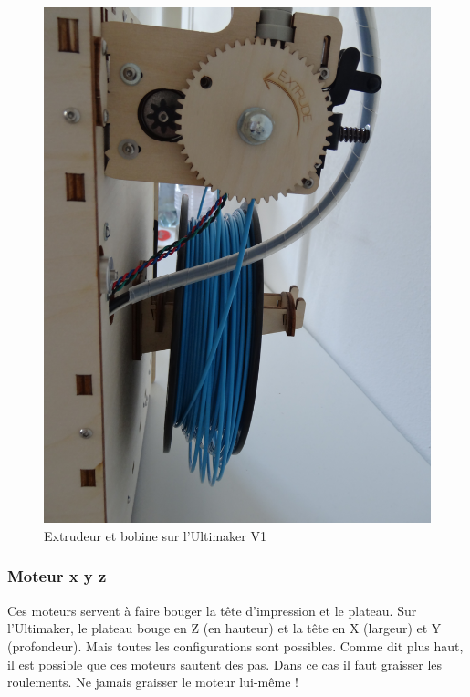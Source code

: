 \begin{figure}[H]
	\centering
	\includegraphics[width=50ex]{02_materiel/extruder.jpg}  
	\caption{Extrudeur et bobine sur l'Ultimaker V1}
	\label{fig:extruder}
\end{figure}

\subsubsection{Moteur x y z}

Ces moteurs servent à faire bouger la tête d'impression et le plateau. Sur l'Ultimaker, le plateau bouge en Z (en hauteur) et la tête en X (largeur) et Y (profondeur). Mais toutes les configurations sont possibles. Comme dit plus haut, il est possible que ces moteurs sautent des pas. Dans ce cas il faut graisser les roulements. Ne jamais graisser le moteur lui-même !

